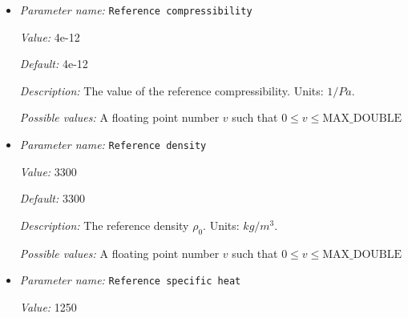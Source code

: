 \begin{itemize}
{\it Value:} 


{\it Default:} 


{\it Description:} The grain size $d_{ph}$ to that a phase will be reduced to when crossing a phase transition. When set to zero, grain size will not be reduced. Units: m.


{\it Possible values:} A list of 0 to 4294967295 elements where each element is [A floating point number $v$ such that $0 \leq v \leq \text{MAX\_DOUBLE}$]
\item {\it Parameter name:} {\tt Reference compressibility}
\label{parameters:Material model/Grain size model/Reference compressibility}
\label{parameters:Material_20model/Grain_20size_20model/Reference_20compressibility}


{\it Value:} 4e-12


{\it Default:} 4e-12


{\it Description:} The value of the reference compressibility. Units: $1/Pa$.


{\it Possible values:} A floating point number $v$ such that $0 \leq v \leq \text{MAX\_DOUBLE}$
\item {\it Parameter name:} {\tt Reference density}
\label{parameters:Material model/Grain size model/Reference density}
\label{parameters:Material_20model/Grain_20size_20model/Reference_20density}


{\it Value:} 3300


{\it Default:} 3300


{\it Description:} The reference density $\rho_0$. Units: $kg/m^3$.


{\it Possible values:} A floating point number $v$ such that $0 \leq v \leq \text{MAX\_DOUBLE}$
\item {\it Parameter name:} {\tt Reference specific heat}
\label{parameters:Material model/Grain size model/Reference specific heat}
\label{parameters:Material_20model/Grain_20size_20model/Reference_20specific_20heat}


{\it Value:} 1250



\end{itemize}
